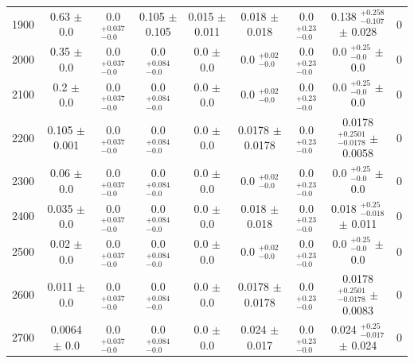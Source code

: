 \begin{table}[H]
\begin{center}
\begin{tabular}{ccccccccc}
            1900  &    	0.63 $\pm$ 0.0  &     	 0.0 $ _{-0.0}^{+0.037}$   &	 0.105 $\pm$ 0.105  &       	 0.015 $\pm$ 0.011  &  	 0.018 $\pm$ 0.018  &           0.0 $ _{-0.0}^{+0.23}$   &      0.138 $ _{-0.107}^{+0.258}$   $\pm$ 0.028  &        0 \\
            2000  &    	0.35 $\pm$ 0.0  &     	 0.0 $ _{-0.0}^{+0.037}$   &	 0.0 $ _{-0.0}^{+0.084}$   &	 0.0 $\pm$ 0.0  &      	 0.0 $ _{-0.0}^{+0.02}$   &     0.0 $ _{-0.0}^{+0.23}$   &      0.0 $ _{-0.0}^{+0.25}$   $\pm$ 0.0  &               0 \\
            2100  &    	0.2 $\pm$ 0.0  &      	 0.0 $ _{-0.0}^{+0.037}$   &	 0.0 $ _{-0.0}^{+0.084}$   &	 0.0 $\pm$ 0.0  &      	 0.0 $ _{-0.0}^{+0.02}$   &     0.0 $ _{-0.0}^{+0.23}$   &      0.0 $ _{-0.0}^{+0.25}$   $\pm$ 0.0  &               0 \\
            2200  &    	0.105 $\pm$ 0.001  &  	 0.0 $ _{-0.0}^{+0.037}$   &	 0.0 $ _{-0.0}^{+0.084}$   &	 0.0 $\pm$ 0.0  &      	 0.0178 $\pm$ 0.0178  &         0.0 $ _{-0.0}^{+0.23}$   &      0.0178 $ _{-0.0178}^{+0.2501}$   $\pm$ 0.0058  &    0 \\
            2300  &    	0.06 $\pm$ 0.0  &     	 0.0 $ _{-0.0}^{+0.037}$   &	 0.0 $ _{-0.0}^{+0.084}$   &	 0.0 $\pm$ 0.0  &      	 0.0 $ _{-0.0}^{+0.02}$   &     0.0 $ _{-0.0}^{+0.23}$   &      0.0 $ _{-0.0}^{+0.25}$   $\pm$ 0.0  &               0 \\
            2400  &    	0.035 $\pm$ 0.0  &    	 0.0 $ _{-0.0}^{+0.037}$   &	 0.0 $ _{-0.0}^{+0.084}$   &	 0.0 $\pm$ 0.0  &      	 0.018 $\pm$ 0.018  &           0.0 $ _{-0.0}^{+0.23}$   &      0.018 $ _{-0.018}^{+0.25}$   $\pm$ 0.011  &         0 \\
            2500  &    	0.02 $\pm$ 0.0  &     	 0.0 $ _{-0.0}^{+0.037}$   &	 0.0 $ _{-0.0}^{+0.084}$   &	 0.0 $\pm$ 0.0  &      	 0.0 $ _{-0.0}^{+0.02}$   &     0.0 $ _{-0.0}^{+0.23}$   &      0.0 $ _{-0.0}^{+0.25}$   $\pm$ 0.0  &               0 \\
            2600  &    	0.011 $\pm$ 0.0  &    	 0.0 $ _{-0.0}^{+0.037}$   &	 0.0 $ _{-0.0}^{+0.084}$   &	 0.0 $\pm$ 0.0  &      	 0.0178 $\pm$ 0.0178  &         0.0 $ _{-0.0}^{+0.23}$   &      0.0178 $ _{-0.0178}^{+0.2501}$   $\pm$ 0.0083  &    0 \\
            2700  &    	0.0064 $\pm$ 0.0  &   	 0.0 $ _{-0.0}^{+0.037}$   &	 0.0 $ _{-0.0}^{+0.084}$   &	 0.0 $\pm$ 0.0  &      	 0.024 $\pm$ 0.017  &           0.0 $ _{-0.0}^{+0.23}$   &      0.024 $ _{-0.017}^{+0.25}$   $\pm$ 0.024  &         0 \\

\end{tabular}
\end{center}
\end{table}
